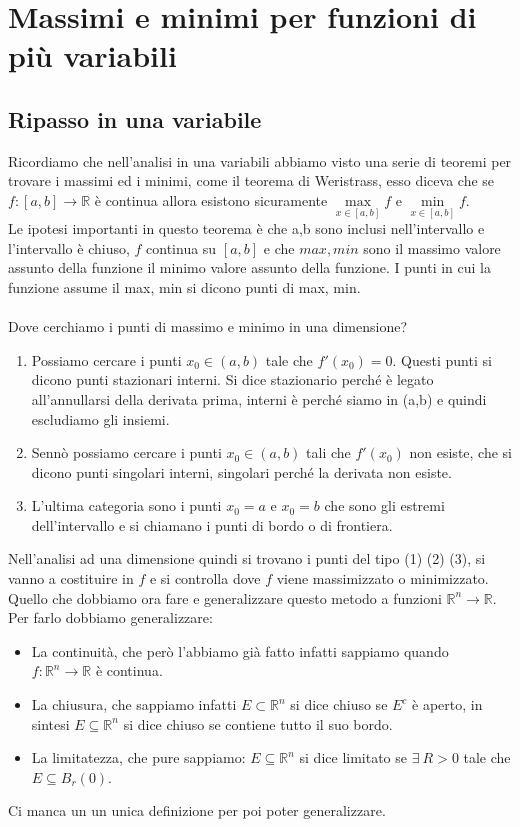 \newpage
\section{Massimi e minimi per funzioni di più variabili}
\subsection{Ripasso in una variabile}
Ricordiamo che nell'analisi in una variabili abbiamo visto una serie di teoremi per trovare i massimi ed i minimi, come il teorema di Weristrass, esso diceva che se $f: [a,b]\to \mathbb{R}$ è continua allora esistono sicuramente $\max\limits_{x \in [a,b]}f$ e $\min\limits_{x \in [a,b]}f$.\\
Le ipotesi importanti in questo teorema è che a,b sono inclusi nell'intervallo e l'intervallo è chiuso, $f$ continua su $[a,b]$ e che $max, min$ sono il massimo valore assunto della funzione il minimo valore assunto della funzione. I punti in cui la funzione assume il max, min si dicono punti di max, min.\\\\
Dove cerchiamo i punti di massimo e minimo in una dimensione? 
\begin{enumerate}
    \item Possiamo cercare i punti $x_0 \in (a,b)$ tale che $f'(x_0) = 0$. Questi punti si dicono punti stazionari interni. Si dice stazionario perché è legato all'annullarsi della derivata prima, interni è perché siamo in (a,b) e quindi escludiamo gli insiemi.
    \item Sennò possiamo cercare i punti $x_0 \in (a,b)$ tali che $f'(x_0)$ non esiste, che si dicono punti singolari interni, singolari perché la derivata non esiste.
    \item L'ultima categoria sono i punti $x_0 = a$ e $x_0 = b$ che sono gli estremi dell'intervallo e si chiamano i punti di bordo o di frontiera.
\end{enumerate}
Nell'analisi ad una dimensione quindi si trovano i punti del tipo (1) (2) (3), si vanno a costituire in $f$ e si controlla dove $f$ viene massimizzato o minimizzato.\\
Quello che dobbiamo ora fare e generalizzare questo metodo a funzioni $\mathbb{R}^n \to \mathbb{R}$. Per farlo dobbiamo generalizzare:
\begin{itemize}
    \item La continuità, che però l'abbiamo già fatto infatti sappiamo quando $f: \mathbb{R}^n \to \mathbb{R}$ è continua.
    \item La chiusura, che sappiamo infatti $E \subset \mathbb{R}^n$ si dice chiuso se $E^c$ è aperto, in sintesi $E \subseteq \mathbb{R}^n$ si dice chiuso se contiene tutto il suo bordo.
    \item La limitatezza, che pure sappiamo: $E\subseteq \mathbb{R}^n$ si dice limitato se $\exists \: R > 0$ tale che $E \subseteq B_r(0)$.
\end{itemize}
Ci manca un un unica definizione per poi poter generalizzare.

